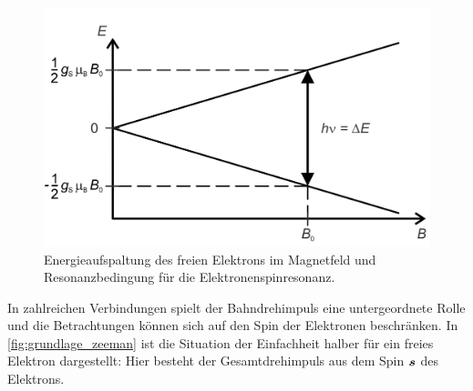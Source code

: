 \documentclass[ngerman]{scrartcl}
\begin{document}
\begin{figure}[H]
    \centering
    \begin{samepage}
        \includegraphics[width=0.65\linewidth]{fig/zeeman_grundlage.png}
        \caption[Zeeman-Effekt]{Energieaufspaltung des freien Elektrons im Magnetfeld
            und Resonanzbedingung für die Elektronenspinresonanz.}
        \label{fig:grundlage_zeeman}
    \end{samepage}
\end{figure}
%
In zahlreichen Verbindungen spielt der Bahndrehimpuls eine untergeordnete Rolle und die Betrachtungen können sich auf den Spin der Elektronen beschränken. In \autoref{fig:grundlage_zeeman} ist die Situation der Einfachheit halber für ein freies Elektron dargestellt: Hier besteht der Gesamtdrehimpuls aus dem Spin $\vb*{s}$ des Elektrons.
\end{document}
